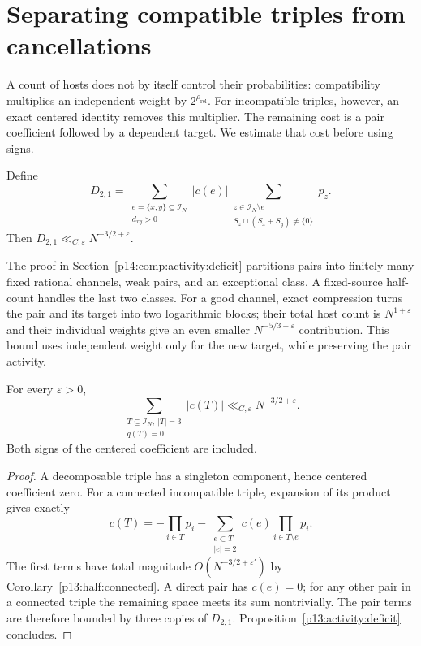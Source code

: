 \section{Separating compatible triples from cancellations}
\label{p13:activity:section}

A count of hosts does not by itself control their probabilities:
compatibility multiplies an independent weight by
\(2^{\rho_{\mathrm{rel}}}\). For incompatible triples,
however, an exact centered identity removes this multiplier.
The remaining cost is a pair coefficient followed by a
dependent target. We estimate that cost before using signs.

\begin{proposition}
\label{p13:activity:deficit}
Define
\[
 D_{2,1}=
 \sum_{\substack{e=\{x,y\}\subseteq\mathcal I_N\\d_{xy}>0}}
 |c(e)|
 \sum_{\substack{z\in\mathcal I_N\setminus e\\
            S_z\cap(S_x+S_y)\ne\{0\}}}p_z.
\]
Then \(D_{2,1}\ll_{C,\varepsilon}N^{-3/2+\varepsilon}\).
\end{proposition}

The proof in Section~\ref{p14:comp:activity:deficit} partitions pairs
into finitely many fixed rational channels, weak pairs, and an
exceptional class.  A fixed-source half-count handles the last two
classes.  For a good channel, exact compression turns the pair and its
target into two logarithmic blocks; their total host count is
$N^{1+\varepsilon}$ and their individual weights give an even smaller
$N^{-5/3+\varepsilon}$ contribution.  This bound uses independent
weight only for the new target, while preserving the pair activity.

\begin{theorem}
\label{p13:activity:incompatible}
For every \(\varepsilon>0\),
\[
 \sum_{\substack{T\subseteq\mathcal I_N,\ |T|=3\\q(T)=0}}
           |c(T)|\ll_{C,\varepsilon}N^{-3/2+\varepsilon}.
\]
Both signs of the centered coefficient are included.
\end{theorem}

\begin{proof}
A decomposable triple has a singleton component, hence
centered coefficient zero. For a connected incompatible
triple, expansion of its product gives exactly
\[
 c(T)=-\prod_{i\in T}p_i
       -\sum_{\substack{e\subset T\\|e|=2}}
                  c(e)\prod_{i\in T\setminus e}p_i.
\]
The first terms have total magnitude
\(O(N^{-3/2+\varepsilon'})\) by
Corollary~\ref{p13:half:connected}.
A direct pair has \(c(e)=0\); for any other pair in a
connected triple the remaining space meets its sum
nontrivially. The pair terms are therefore bounded by
three copies of \(D_{2,1}\).
Proposition~\ref{p13:activity:deficit} concludes.
\end{proof}

